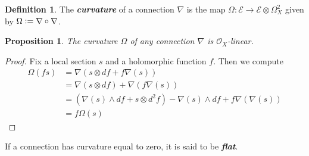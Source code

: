\documentclass[psamsfonts, 12pt]{amsart}
\newtheorem{prop}[thm]{Proposition}
\theoremstyle{definition}
\newtheorem{defn}[thm]{Definition}
\theoremstyle{remark}
\renewcommand{\O}{\mathcal{O}}
\newcommand{\ib}[1]{\textbf{\textit{#1}}}
\newcommand{\defeq}{\vcentcolon=}
\begin{document}
%
\begin{defn}
The \ib{curvature} of a connection $\nabla$ is the map
$\Omega : \mathcal{E} \to \mathcal{E} \otimes \Omega^2_X$ given by
$\Omega \defeq \nabla \circ \nabla$.
\end{defn}
%
\begin{prop}
The curvature $\Omega$ of any connection $\nabla$ is $\O_X$-linear.
\end{prop}
%
\begin{proof}
Fix a local section $s$ and a holomorphic function $f$. Then we compute
\begin{align*}
\Omega(fs) &= \nabla(s \otimes df + f\nabla(s)) \\
&= \nabla(s \otimes df) + \nabla(f\nabla(s)) \\
&= (\nabla(s) \wedge df + s \otimes d^2f) - \nabla(s)\wedge df + f\nabla(\nabla(s)) \\
&= f\Omega(s)
\end{align*}
\end{proof}
%
If a connection has curvature equal to zero, it is said to be \ib{flat}. \\
\end{document}
